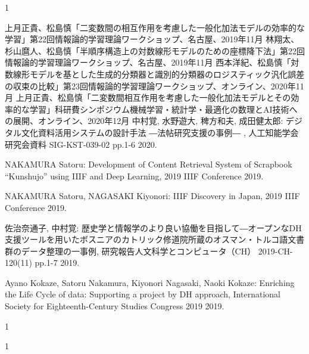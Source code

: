 \begin{発表}{1}

 上月正貴、松島慎「二変数間の相互作用を考慮した一般化加法モデルの効率的な学習」第22回情報論的学習理論ワークショップ、名古屋、2019年11月
 林翔太、杉山麿人、松島慎「半順序構造上の対数線形モデルのための座標降下法」第22回情報論的学習理論ワークショップ、名古屋、2019年11月
 西本洋紀、松島慎「対数線形モデルを基とした生成的分類器と識別的分類器のロジスティック汎化誤差の収束の比較」第23回情報論的学習理論ワークショップ、オンライン、2020年11月
 上月正貴、松島慎「二変数間相互作用を考慮した一般化加法モデルとその効率的な学習」科研費シンポジウム機械学習・統計学・最適化の数理とAI技術への展開、オンライン、2020年12月
中村覚, 水野遊大, 稗方和夫, 成田健太郎:
 デジタル文化資料活用システムの設計手法 ―法帖研究支援の事例― ,  人工知能学会研究会資料 SIG-KST-039-02 pp.1-6 2020.

NAKAMURA Satoru:
 Development of Content Retrieval System of Scrapbook “Kunshujo” using IIIF and Deep Learning,  2019 IIIF Conference 2019.

NAKAMURA Satoru, NAGASAKI Kiyonori:
 IIIF Discovery in Japan,  2019 IIIF Conference 2019.

佐治奈通子, 中村覚:
 歴史学と情報学のより良い協働を目指して―オープンなDH支援ツールを用いたボスニアのカトリック修道院所蔵のオスマン・トルコ語文書群のデータ整理の一事例,  研究報告人文科学とコンピュータ（CH） 2019-CH-120(11) pp.1-7 2019.

Ayano Kokaze, Satoru Nakamura, Kiyonori Nagasaki, Naoki Kokaze:
 Enriching the Life Cycle of data: Supporting a project by DH approach,  International Society for Eighteenth-Century Studies Congress 2019 2019.

\end{発表}

\begin{特記}{1}

\end{特記}

\begin{報道}{1}


\end{報道}
